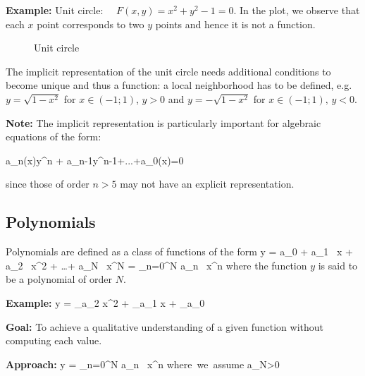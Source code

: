 {\bf Example:} Unit circle: $\quad F(x,y)=x^2+y^2-1=0$. In the plot, we observe that
each $x$ point corresponds to two $y$ points and hence it is not a function. \svs

\begin{figure}[!h]
    \centerline{\epsfxsize=7cm \epsfysize=7cm } \svs
    \caption{Unit circle} \label{fig7}
\end{figure} \svs

The implicit representation of the unit circle needs additional conditions to become
unique and thus a function: a local neighborhood has to be defined, e.g. $y=\sqrt{1-x^2}$
for \mbox{$x\in (-1;1)$},  \mbox{$y >0$} and $y=-\sqrt{1-x^2}$ for $x\in (-1;1), \, y<0$.

{\bf Note:} The implicit representation is particularly important for algebraic equations
of the form:

\bnn
a_n(x)y^n + a_{n-1}y^{n-1}+...+a_0(x)=0
\enn

since those of order $n>5$ may not have an explicit representation.

\subsection{Polynomials}
Polynomials are defined as a class of functions of the form
\bnn y = a_0 + a_1 \, x + a_2 \, x^2 + \dots + a_N \, x^N = \sum_{n=0}^N a_n \, x^n \enn
where the function $y$ is said to be a polynomial of order $N$.  \svs

{\bf Example:}
\bnn y = _{a_2} x^2 + _{a_1} x + _{a_0} \enn

{\bf Goal:} To achieve a qualitative understanding of a given function without computing each value.

{\bf Approach:}
\bnn y = \sum_{n=0}^N a_n \, x^n  \qquad \mbox{where we assume} \;\; a_N>0 \enn

